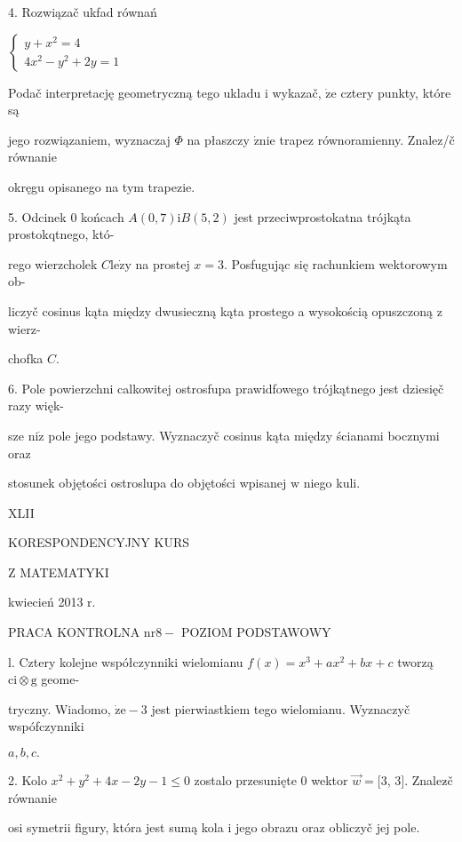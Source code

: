 \documentclass[a4paper,12pt]{article}
\begin{document}
4. Rozwiązač ukfad równań

$\left\{\begin{array}{l}
y+x^{2}=4\\
4x^{2}-y^{2}+2y=1
\end{array}\right.$

Podač interpretację geometryczną tego ukladu $\mathrm{i}$ wykazač, $\dot{\mathrm{z}}\mathrm{e}$ cztery punkty, które są

jego rozwiązaniem, wyznaczaj $\Phi$ na płaszczy $\acute{\mathrm{z}}\mathrm{n}\mathrm{i}\mathrm{e}$ trapez równoramienny. Znalez/č równanie

okręgu opisanego na tym trapezie.

5. Odcinek $0$ końcach $A(0,7)\mathrm{i}B(5,2)$ jest przeciwprostokatna trójkąta prostokqtnego, któ-

rego wierzcholek $C\mathrm{l}\mathrm{e}\dot{\mathrm{z}}\mathrm{y}$ na prostej $x=3$. Posfugując się rachunkiem wektorowym ob-

liczyč cosinus kąta między dwusieczną kąta prostego a wysokością opuszczoną $\mathrm{z}$ wierz-

chofka $C.$

6. Pole powierzchni calkowitej ostrosfupa prawidfowego trójkątnego jest dziesięč razy więk-

sze $\mathrm{n}\mathrm{i}\dot{\mathrm{z}}$ pole jego podstawy. Wyznaczyč cosinus kąta między ścianami bocznymi oraz

stosunek objętości ostroslupa do objętości wpisanej $\mathrm{w}$ niego kuli.





XLII

KORESPONDENCYJNY KURS

Z MATEMATYKI

kwiecień 2013 r.

PRACA KONTROLNA $\mathrm{n}\mathrm{r} 8-$ POZIOM PODSTAWOWY

l. Cztery kolejne współczynniki wielomianu $f(x)=x^{3}+ax^{2}+bx+c$ tworzą $\mathrm{c}\mathrm{i}\otimes \mathrm{g}$ geome-

tryczny. Wiadomo, $\dot{\mathrm{z}}\mathrm{e}-3$ jest pierwiastkiem tego wielomianu. Wyznaczyč wspófczynniki

$a, b, c.$

2. Kolo $x^{2}+y^{2}+4x-2y-1\leq 0$ zostalo przesunięte $0$ wektor $\vec{w}=[3$, 3$]$. Znalez$\acute{}$č równanie

osi symetrii figury, która jest sumą kola $\mathrm{i}$ jego obrazu oraz obliczyč jej pole.
\end{document}
